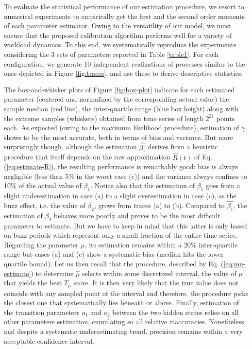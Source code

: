 \documentclass[twoside]{article}
\newcommand{\roy}[2]{#2}
\begin{document}
{
To evaluate the statistical performance of our estimation procedure, we resort to numerical experiments to empirically get the first and the second order moments of each parameter estimator. Owing to  the versatility of our model, we must ensure that the proposed calibration algorithm performs well for a variety of workload dynamics. To this end, we systematically reproduce the experiments considering the 3 sets of parameters reported in Table \ref{table1}. For each configuration, we generate 10 independent  realizations of processes similar to the ones depicted in Figure \ref{fig:traces}, and use these to derive  descriptive statistics. 

The box-and-whisker plots of Figure \ref{fig:box-plot} indicate for each estimated parameter (centered and normalized by the corresponding actual value) the sample median (red line), the inter-quartile range (blue box height) along with  the extreme samples (whiskers) obtained from time series of length $2^{21}$ points each. As expected (owing to the maximum likelihood procedure), estimation of $\gamma$ shows to be the most accurate, both in terms of bias and variance. But more surprisingly though, although the estimation $\widehat{\beta_1}$ derives from a heuristic procedure that  itself depends on the raw approximation $\widehat{R}(t)$ of Eq. (\ref{eq:estimate-R}), the resulting performance is remarkably good: bias is always negligible (less than 5\% in the worst case (c))  and the variance always confines to 10\% of the actual value of $\beta_1$. Notice also that the estimation of $\beta_1$ goes from a slight underestimation in case (a) to a slight overestimation in case (c), as the buzz effect,  i.e. the value of $\beta_2$, grows from traces (a) to (b). Compared to $\widehat{\beta_1}$, the estimation of ${\beta_2}$ behaves more poorly and proves to be the most difficult parameter to estimate. But we have to keep in mind that this latter is only based on buzz periods which represent only a small fraction of the entire time series. Regarding the parameter $\mu$, its estimation remains within a 20\% inter-quartile range but cases (a) and (c) show a systematic bias (median hits the lower quartile bound). Let us then recall that the procedure\roy{}{, described by Eq.} (\ref{eq:mu-estimate}) to determine $\widehat{\mu}$ selects within some discretized interval, the value of $\mu$ that yields the best $T_{\mu}$ score. It is then very likely that the true value does not coincide with any sampled point of the interval and therefore, the procedure picks the closest one that systematically lies beneath or above. Finally,  estimation of the transition parameters $a_1$ and $a_2$ between the two hidden states relies on all other parameters estimation, cumulating so all relative inaccuracies. Nonetheless and despite a systematic underestimating trend, precision remains within a very acceptable confidence interval. 
}
\end{document}
